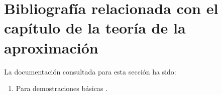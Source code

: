 
\section{Bibliografía relacionada con el capítulo de la teoría de la aproximación} 

La documentación consultada para esta sección ha sido: 

\begin{enumerate}
    \item Para demostraciones básicas \cite{the-elements-of-real-analysis}. 
\end{enumerate}
